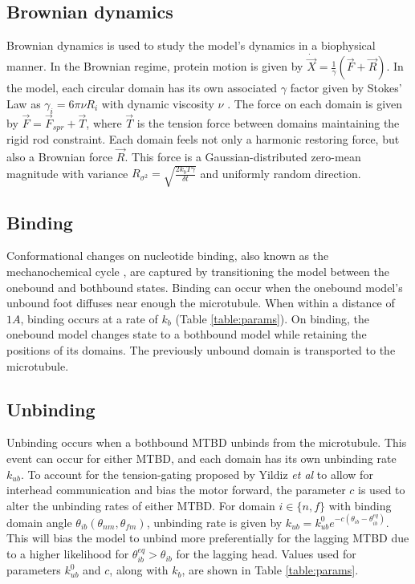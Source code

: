\documentclass[9pt,twocolumn,twoside]{pnas-new}
\begin{document}
\subsection*{Brownian dynamics}
Brownian dynamics is used to study the model's dynamics in a biophysical manner. In the Brownian regime, protein motion is given by $\dot{\vec{X}} = \frac{1}{\gamma}\left(\vec{F}+\vec{R}\right)$. In the model, each circular domain has its own associated $\gamma$ factor given by Stokes' Law as $\gamma_i = 6\pi\nu R_i$ with dynamic viscosity $\nu$ \cite{stokeslaw}. The force on each domain is given by $\vec{F} = \vec{F}_{spr} + \vec{T}$, where $\vec{T}$ is the tension force between domains maintaining the rigid rod constraint. Each domain feels not only a harmonic restoring force, but also a Brownian force $\vec{R}$. This force is a Gaussian-distributed zero-mean magnitude with variance $R_{\sigma^2} = \sqrt{\frac{2k_bT\gamma}{\delta t}}$ \cite{einstein} and uniformly random direction.

\subsection*{Binding}
Conformational changes on nucleotide binding, also known as the mechanochemical cycle \cite{cianfrocco}, are captured by transitioning the model between the onebound and bothbound states. Binding can occur when the onebound model's unbound foot diffuses near enough the microtubule. When within a distance of $1 A$, binding occurs at a rate of $k_b$ (Table \ref{table:params}). On binding, the onebound model changes state to a bothbound model while retaining the positions of its domains. The previously unbound domain is transported to the microtubule.

\subsection*{Unbinding}
Unbinding occurs when a bothbound MTBD unbinds from the microtubule. This event can occur for either MTBD, and each domain has its own unbinding rate $k_{ub}$. To account for the tension-gating proposed by Yildiz \textit{et al} \cite{yildiz} to allow for interhead communication and bias the motor forward, the parameter $c$ is used to alter the unbinding rates of either MTBD. For domain $i \in \{n, f\}$ with binding domain angle $\theta_{ib}\left(\theta_{nm}, \theta_{fm}\right)$, unbinding rate is given by $k_{ub} = k^0_{ub}e^{-c\left(\theta_{ib}-\theta^{eq}_{ib}\right)}$. This will bias the model to unbind more preferentially for the lagging MTBD due to a higher likelihood for $\theta^{eq}_{ib} > \theta_{ib}$ for the lagging head. Values used for parameters $k^0_{ub}$ and $c$, along with $k_b$, are shown in Table \ref{table:params}.\\
\end{document}
